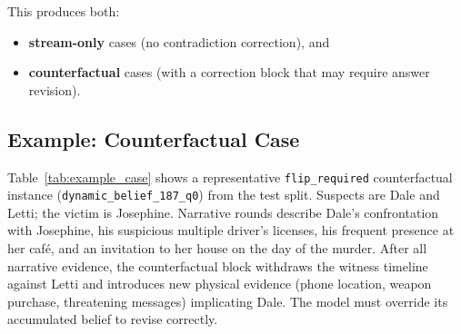 \documentclass{article}
\begin{document}
This produces both:
\begin{itemize}
  \item \textbf{stream-only} cases (no contradiction correction), and
  \item \textbf{counterfactual} cases (with a correction block that may require answer revision).
\end{itemize}

\subsection{Example: Counterfactual Case}

Table~\ref{tab:example_case} shows a representative \texttt{flip\_required} counterfactual instance (\texttt{dynamic\_belief\_187\_q0}) from the test split. Suspects are Dale and Letti; the victim is Josephine. Narrative rounds describe Dale's confrontation with Josephine, his suspicious multiple driver's licenses, his frequent presence at her café, and an invitation to her house on the day of the murder. After all narrative evidence, the counterfactual block withdraws the witness timeline against Letti and introduces new physical evidence (phone location, weapon purchase, threatening messages) implicating Dale. The model must override its accumulated belief to revise correctly.
\end{document}
